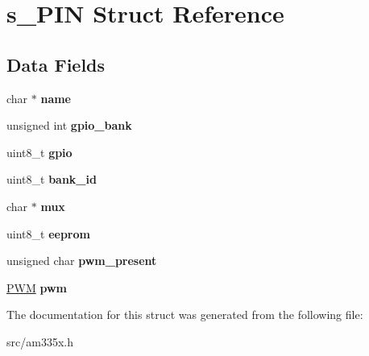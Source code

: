 \hypertarget{structs___p_i_n}{\section{s\-\_\-\-P\-I\-N Struct Reference}
\label{structs___p_i_n}
}
\subsection*{Data Fields}
\begin{DoxyCompactItemize}
\item 
\hypertarget{structs___p_i_n_a5ac083a645d964373f022d03df4849c8}{char $\ast$ {\bfseries name}}\label{structs___p_i_n_a5ac083a645d964373f022d03df4849c8}

\item 
\hypertarget{structs___p_i_n_a51c31aad6d06ea919700fb1a180688bd}{unsigned int {\bfseries gpio\-\_\-bank}}\label{structs___p_i_n_a51c31aad6d06ea919700fb1a180688bd}

\item 
\hypertarget{structs___p_i_n_a80b2e88e969b3ee6cde0d4380eadc5dd}{uint8\-\_\-t {\bfseries gpio}}\label{structs___p_i_n_a80b2e88e969b3ee6cde0d4380eadc5dd}

\item 
\hypertarget{structs___p_i_n_a9ef376f6d84af9699e87709d7662cf74}{uint8\-\_\-t {\bfseries bank\-\_\-id}}\label{structs___p_i_n_a9ef376f6d84af9699e87709d7662cf74}

\item 
\hypertarget{structs___p_i_n_a268ae5ca019047bc0bc32f45f6e4c8a0}{char $\ast$ {\bfseries mux}}\label{structs___p_i_n_a268ae5ca019047bc0bc32f45f6e4c8a0}

\item 
\hypertarget{structs___p_i_n_a7589e79ff8d69f5bff025fe44090cc6a}{uint8\-\_\-t {\bfseries eeprom}}\label{structs___p_i_n_a7589e79ff8d69f5bff025fe44090cc6a}

\item 
\hypertarget{structs___p_i_n_ad9d4ffb703dd541884e772f4490febd9}{unsigned char {\bfseries pwm\-\_\-present}}\label{structs___p_i_n_ad9d4ffb703dd541884e772f4490febd9}

\item 
\hypertarget{structs___p_i_n_a6208909b76c84a75b931c78e24a0cc42}{\hyperlink{structs___p_w_m}{P\-W\-M} {\bfseries pwm}}\label{structs___p_i_n_a6208909b76c84a75b931c78e24a0cc42}

\end{DoxyCompactItemize}


The documentation for this struct was generated from the following file\-:\begin{DoxyCompactItemize}
\item 
src/am335x.\-h\end{DoxyCompactItemize}
